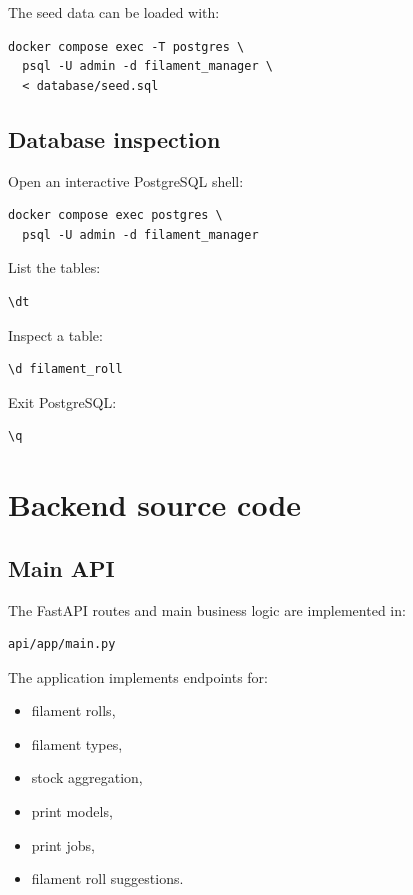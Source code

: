\documentclass[a4paper,11pt]{article}
\begin{document}
The seed data can be loaded with:

\begin{lstlisting}
docker compose exec -T postgres \
  psql -U admin -d filament_manager \
  < database/seed.sql
\end{lstlisting}

\subsection{Database inspection}

Open an interactive PostgreSQL shell:

\begin{lstlisting}
docker compose exec postgres \
  psql -U admin -d filament_manager
\end{lstlisting}

List the tables:

\begin{lstlisting}
\dt
\end{lstlisting}

Inspect a table:

\begin{lstlisting}
\d filament_roll
\end{lstlisting}

Exit PostgreSQL:

\begin{lstlisting}
\q
\end{lstlisting}

\section{Backend source code}

\subsection{Main API}

The FastAPI routes and main business logic are implemented in:

\begin{lstlisting}
api/app/main.py
\end{lstlisting}

The application implements endpoints for:

\begin{itemize}
  \item filament rolls,
  \item filament types,
  \item stock aggregation,
  \item print models,
  \item print jobs,
  \item filament roll suggestions.
\end{itemize}
\end{document}
